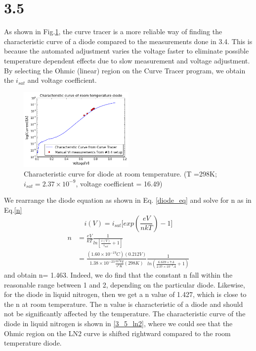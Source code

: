 \documentclass[authoryear, 12pt,5p, times]{elsarticle}
\begin{document}
\section*{3.5}
As shown in Fig.\ref{3_5_norm}, the curve tracer is a more reliable way of finding the characteristic curve of a diode compared to the measurements done in 3.4. This is because the automated adjustment varies the voltage faster to eliminate possible temperature dependent effects due to slow measurement and voltage adjustment.  By selecting the Ohmic (linear) region on the Curve Tracer program, we obtain the $i_{sat}$ and voltage coefficient. 
\begin{figure}[h!]
\center
\includegraphics[width=0.5\textwidth]{figure/3_5_norm}
\caption{Characteristic curve for diode at room temperature. (T =298K; $i_{sat}=2.37\times10^{-9}$, voltage coefficient = 16.49) }
\label{3_5_norm}
\end{figure}
\par We rearrange the diode equation as shown in Eq. \ref{diode_eq} and solve for n as in Eq.\ref{n}
\begin{equation}
i(V) = i_{sat}\Bigg[exp(\frac{eV}{nkT})-1\Bigg]
\label{diode_eq}
\end{equation}
\begin{equation}
\begin{split}
n &= \frac{eV}{kT}\frac{1}{ln[\frac{i(V)}{i_{sat}}+1]} \\&= \frac{(1.60\times10^{-19}C)(0.212V)}{1.38\times10^{-23}\frac{m^2kg}{s^{2}K}(298K)}\frac{1}{ln(\frac{6.639\times7A}{2.37\times10^{-9}A}+1)}
\label{n}
\end{split}
\end{equation}
and obtain n= 1.463. Indeed, we do find that the constant n fall within the reasonable range between 1 and 2,  depending on the particular diode. Likewise,%
for the diode in liquid nitrogen, then we get a n value of 1.427, which is close to the n at room temperature. The n value is characteristic of a diode and should not be significantly affected by the temperature. The characteristic curve of the diode in liquid nitrogen is shown in \ref{3_5_ln2}, where we could see that the Ohmic region on the LN2 curve is shifted rightward compared to the room temperature diode.
\end{document}
